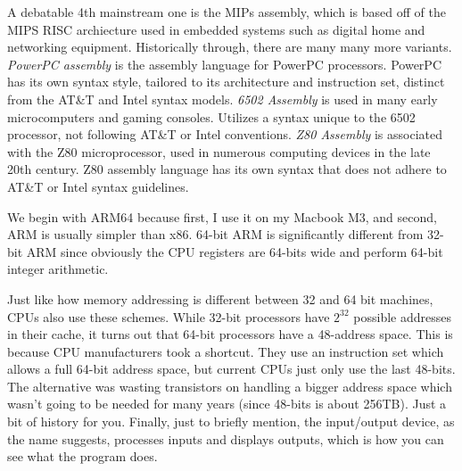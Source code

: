\begin{definition}[RISC-V]
  \label{def:risc-v}
  
\end{definition}

A debatable 4th mainstream one is the MIPs assembly, which is based off of the MIPS RISC archiecture used in embedded systems such as digital home and networking equipment. Historically through, there are many many more variants. \textit{PowerPC assembly} is the assembly language for PowerPC processors. PowerPC has its own syntax style, tailored to its architecture and instruction set, distinct from the AT\&T and Intel syntax models. \textit{6502 Assembly} is used in many early microcomputers and gaming consoles. Utilizes a syntax unique to the 6502 processor, not following AT\&T or Intel conventions. \textit{Z80 Assembly} is associated with the Z80 microprocessor, used in numerous computing devices in the late 20th century. Z80 assembly language has its own syntax that does not adhere to AT\&T or Intel syntax guidelines.

We begin with ARM64 because first, I use it on my Macbook M3, and second, ARM is usually simpler than x86. 64-bit ARM is significantly different from 32-bit ARM since obviously the CPU registers are 64-bits wide and perform 64-bit integer arithmetic. 

Just like how memory addressing is different between 32 and 64 bit machines, CPUs also use these schemes. While 32-bit processors have $2^{32}$ possible addresses in their cache, it turns out that 64-bit processors have a 48-address space. This is because CPU manufacturers took a shortcut. They use an instruction set which allows a full 64-bit address space, but current CPUs just only use the last 48-bits. The alternative was wasting transistors on handling a bigger address space which wasn't going to be needed for many years (since 48-bits is about 256TB). Just a bit of history for you. Finally, just to briefly mention, the input/output device, as the name suggests, processes inputs and displays outputs, which is how you can see what the program does. 

